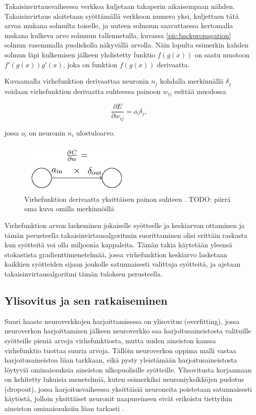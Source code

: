 \documentclass[finnish]{tktltiki2}
\theoremstyle{definition}
\theoremstyle{remark}
\begin{document}
  Takaisinvirtausvaiheessa verkkoa kuljetaan takaperin aikaisempaan nähden. Takaisinvirtaus aloitetaan syöttämällä verkkoon numero yksi, kuljettaen tätä arvoa mukana solmulta toiselle, ja uuteen solmuun saavuttaessa kertomalla mukana kulkeva arvo solmuun tallennetulla, kuvassa \ref{pic:backpropagation} solmun vasemmalla puoliskolla näkyvällä arvolla. Näin lopulta esimerkin kahden solmun läpi kulkemisen jälkeen yhdistetty funktio $f(g(x))$ on saatu muotoon $f'(g(x))g'(x)$, joka on funktion $f(g(x))$ derivaatta. 

  Kuvaamalla virhefunktion derivaattaa neuronin $n_j$ kohdalla merkinnällä $\delta_j$ voidaan virhefunktion derivaatta suhteessa painoon $w_{ij}$ esittää muodossa 

    $$ \frac{\partial E}{\partial w_{ij}} = o_i\delta_j,$$

  jossa $o_i$ on neuronin $n_i$ ulostuloarvo.

  \begin{figure}[h]
    \centering
    \includegraphics[scale=0.8]{cost-derivative}
    \caption{Virhefunktion derivaatta yksittäisen painon suhteen \cite{Nielsen-neural}. TODO: piirrä oma kuva omilla merkinnöillä}
    \label{pic:cost-weight-derivative}
  \end{figure}

  Virhefunktion arvon laskeminen jokaiselle syötteelle ja keskiarvon ottaminen ja tämän perusteella takaisinvirtausalgoritmin suorittaminen olisi erittäin raskasta kun syötteitä voi olla miljoonia kappaleita. Tämän takia käytetään yleensä stokastista gradienttimenetelmää, jossa virhefunktion keskiarvo lasketaan kaikkien syötteiden sijaan joukolle satunnaisesti valittuja syötteitä, ja ajetaan takaisinvirtausalgoritmi tämän tuloksen perusteella.

  \subsection{Ylisovitus ja sen ratkaiseminen}

  Suuri haaste neuroverkkojen harjoittamisessa on ylisovitus (overfitting), jossa neuroverkon harjoittamisen jälkeen neuroverkko saa harjoitusaineistosta valituille syötteille pieniä arvoja virhefunktiosta, mutta uuden aineiston kanssa virhefunktio tuottaa suuria arvoja. Tällöin neuroverkon oppima malli vastaa harjoitusaineistoa liian tarkkaan, eikä pysty yleistämään harjoitusaineistosta löytyviä ominaisuuksia aineiston ulkopuolisille syötteille. Ylisovitusta korjaamaan on kehitetty lukuisia menetelmiä, kuten esimerkiksi neuroniyksikköjen pudotus (dropout), jossa harjoitusvaiheessa yksittäisiä neuroneita poistetaan satunnaisesti käytöstä, jolloin yksittäiset neuronit naapureineen eivät erikoistu tiettyihin aineiston ominaisuuksiin liian tarkasti \cite{dropout-srivastava}.
\end{document}
